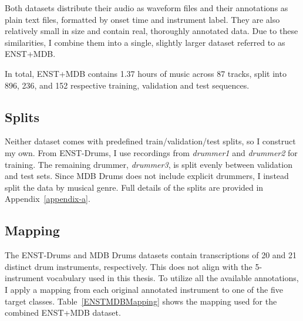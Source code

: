 Both datasets distribute their audio as waveform files and their annotations as plain text files, formatted by onset time and instrument label. They are also relatively small in size and contain real, thoroughly annotated data. Due to these similarities, I combine them into a single, slightly larger dataset referred to as ENST+MDB.

In total, ENST+MDB contains 1.37 hours of music across 87 tracks, split into 896, 236, and 152 respective training, validation and test sequences.

\subsection{Splits}

Neither dataset comes with predefined train/validation/test splits, so I construct my own. From ENST-Drums, I use recordings from \textit{drummer1} and \textit{drummer2} for training. The remaining drummer, \textit{drummer3}, is split evenly between validation and test sets. Since MDB Drums does not include explicit drummers, I instead split the data by musical genre. Full details of the splits are provided in Appendix~\ref{appendix-a}.

\subsection{Mapping}

The ENST-Drums and MDB Drums datasets contain transcriptions of 20 and 21 distinct drum instruments, respectively. This does not align with the 5-instrument vocabulary used in this thesis. To utilize all the available annotations, I apply a mapping from each original annotated instrument to one of the five target classes. Table~\ref{ENSTMDBMapping} shows the mapping used for the combined ENST+MDB dataset.

